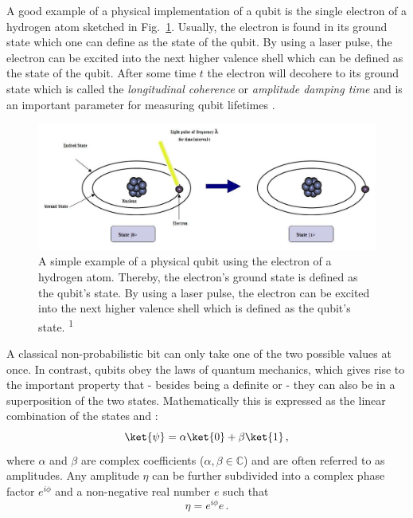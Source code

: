 A good example of a physical implementation of a qubit is the single electron of a hydrogen atom sketched in Fig.~\ref{img:qubitatom}. Usually, the electron is found in its ground state which one can define as the \0 state of the qubit. By using a laser pulse, the electron can be excited into the next higher valence shell which can be defined as the \1 state of the qubit. After some time $t$ the electron will decohere to its ground state \0 which is called the \emph{longitudinal coherence} or \emph{amplitude damping time} and is an important parameter for measuring qubit lifetimes \cite{chuanglecturenotes}.

\begin{figure}[!ht]
       \centering
       \includegraphics[scale=0.35]{img/qubitimplementation.jpeg}
       \caption[]{\label{img:qubitatom} A simple example of a physical qubit using the electron of a hydrogen atom. Thereby, the electron's ground state is defined as the qubit's \0 state. By using a laser pulse, the electron can be excited into the next higher valence shell which is defined as the qubit's \1 state. \textsuperscript{1}}
\end{figure}

\pagebreak
A classical non-probabilistic bit can only take one of the two possible values at once. In contrast, qubits obey the laws of quantum mechanics, which gives rise to the important property that - besides being a definite \0 or \1 - they can also be in a superposition of the two states. Mathematically this is expressed as the linear combination of the states \0 and \1:
\begin{equation}
\label{equ: simplequbit}
\ket{\psi} = \alpha \ket{0} + \beta \ket{1}\, ,
\end{equation}
where $\alpha$ and $\beta$ are complex coefficients ($\alpha, \beta \in \mathbb{C}$) and are often referred to as amplitudes. Any amplitude $\eta$ can be further subdivided into a complex phase factor $e^{i\phi}$ and a non-negative real number $e$ such that
\begin{equation}
\label{equ: amplitude}
\eta = e^{i\phi}e\, .
\end{equation}
 
